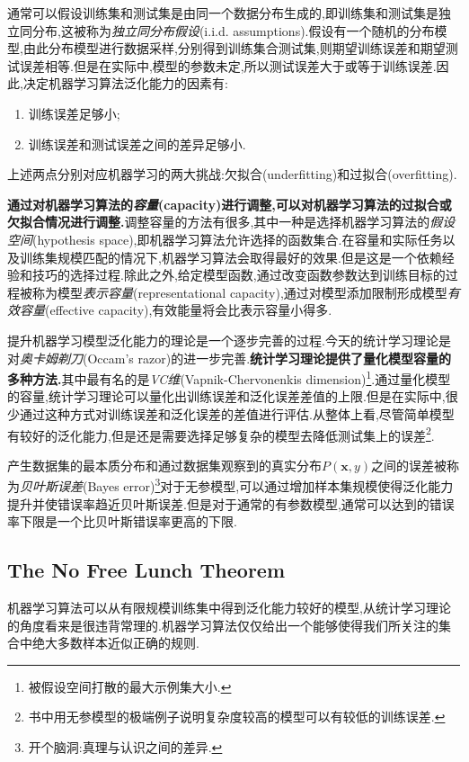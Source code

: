 通常可以假设训练集和测试集是由同一个数据分布生成的,即训练集和测试集是独立同分布,这被称为\textit{独立同分布假设}(i.i.d. assumptions).假设有一个随机的分布模型,由此分布模型进行数据采样,分别得到训练集合测试集,则期望训练误差和期望测试误差相等.但是在实际中,模型的参数未定,所以测试误差大于或等于训练误差.因此,决定机器学习算法泛化能力的因素有:
\begin{enumerate}
\item 训练误差足够小;
\item 训练误差和测试误差之间的差异足够小.
\end{enumerate}
上述两点分别对应机器学习的两大挑战:欠拟合(underfitting)和过拟合(overfitting).

\textbf{通过对机器学习算法的\textit{容量}(capacity)进行调整,可以对机器学习算法的过拟合或欠拟合情况进行调整.}调整容量的方法有很多,其中一种是选择机器学习算法的\textit{假设空间}(hypothesis space),即机器学习算法允许选择的函数集合.在容量和实际任务以及训练集规模匹配的情况下,机器学习算法会取得最好的效果.但是这是一个依赖经验和技巧的选择过程.除此之外,给定模型函数,通过改变函数参数达到训练目标的过程被称为模型\textit{表示容量}(representational capacity),通过对模型添加限制形成模型\textit{有效容量}(effective capacity),有效能量将会比表示容量小得多.

 提升机器学习模型泛化能力的理论是一个逐步完善的过程.今天的统计学习理论是对\textit{奥卡姆剃刀}(Occam's razor)的进一步完善.\textbf{统计学习理论提供了量化模型容量的多种方法.}其中最有名的是\textit{VC维}(Vapnik-Chervonenkis dimension)\footnote{被假设空间打散的最大示例集大小.}.通过量化模型的容量,统计学习理论可以量化出训练误差和泛化误差差值的上限.但是在实际中,很少通过这种方式对训练误差和泛化误差的差值进行评估.从整体上看,尽管简单模型有较好的泛化能力,但是还是需要选择足够复杂的模型去降低测试集上的误差\footnote{书中用无参模型的极端例子说明复杂度较高的模型可以有较低的训练误差.}.

产生数据集的最本质分布和通过数据集观察到的真实分布$P(\mathbf x, y)$之间的误差被称为\textit{贝叶斯误差}(Bayes error)\footnote{开个脑洞:真理与认识之间的差异.}对于无参模型,可以通过增加样本集规模使得泛化能力提升并使错误率趋近贝叶斯误差.但是对于通常的有参数模型,通常可以达到的错误率下限是一个比贝叶斯错误率更高的下限.

\subsection{The No Free Lunch Theorem}

机器学习算法可以从有限规模训练集中得到泛化能力较好的模型,从统计学习理论的角度看来是很违背常理的.机器学习算法仅仅给出一个能够使得我们所关注的集合中绝大多数样本近似正确的规则.

